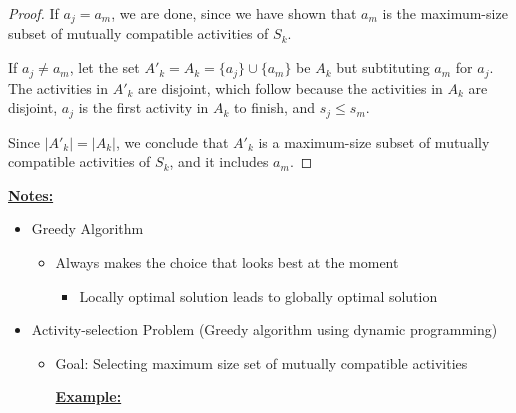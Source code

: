 \documentclass[12pt]{article}
\begin{document}
\begin{enumerate}[1.]
\begin{enumerate}[1)]
\begin{proof}
        \bigskip

        If $a_j = a_m$, we are done, since we have shown that $a_m$ is the maximum-size
        subset of mutually compatible activities of $S_k$.

        \bigskip

        If $a_j \neq a_m$, let the set $A'_k = A_k = \{a_j\} \cup \{a_m\}$ be
        $A_k$ but subtituting $a_m$ for $a_j$. The activities in $A'_k$ are disjoint,
        which follow because the activities in $A_k$ are disjoint, $a_j$ is the
        first activity in $A_k$ to finish, and $s_j \leq s_m$.

        \bigskip

        Since $\lvert A'_k \rvert = \lvert A_k \rvert$, we conclude that $A'_k$
        is a maximum-size subset of mutually compatible activities of $S_k$, and it includes $a_m$.
        \end{proof}
    \end{enumerate}

    \bigskip

    \underline{\textbf{Notes:}}

    \bigskip

    \begin{itemize}
        \item Greedy Algorithm

        \begin{itemize}
            \item Always makes the choice that looks best at the moment

            \begin{itemize}
                \item Locally optimal solution leads to globally optimal solution
            \end{itemize}

        \end{itemize}

        \item Activity-selection Problem (Greedy algorithm using dynamic programming)

        \begin{itemize}
            \item Goal: Selecting maximum size set of mutually compatible activities

            \bigskip

            \underline{\textbf{Example:}}

            \bigskip


\end{itemize}
\end{itemize}
\end{enumerate}
\end{document}
